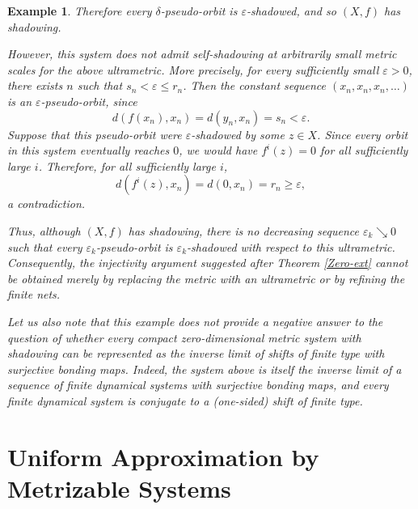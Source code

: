 \documentclass[10pt,a4paper]{amsart}
\numberwithin{equation}{section}
\newtheorem{example}[theorem]{Example}
\begin{document}
\begin{example}
Therefore every $\delta$-pseudo-orbit is $\varepsilon$-shadowed, and so
$(X,f)$ has shadowing.

However, this system does not admit self-shadowing at arbitrarily small metric
scales for the above ultrametric. More precisely, for every sufficiently small
$\varepsilon>0$, there exists $n$ such that $s_n<\varepsilon\leq r_n$. Then the
constant sequence $(x_n,x_n,x_n,\ldots)$ is an $\varepsilon$-pseudo-orbit, since
\[
    d(f(x_n),x_n)=d(y_n,x_n)=s_n<\varepsilon.
\]
Suppose that this pseudo-orbit were $\varepsilon$-shadowed by some $z\in X$.
Since every orbit in this system eventually reaches $0$, we would have
$f^i(z)=0$ for all sufficiently large $i$. Therefore, for all sufficiently large
$i$,
\[
    d(f^i(z),x_n)=d(0,x_n)=r_n\geq \varepsilon,
\]
a contradiction.

Thus, although $(X,f)$ has shadowing, there is no decreasing sequence
$\varepsilon_k\searrow 0$ such that every $\varepsilon_k$-pseudo-orbit is
$\varepsilon_k$-shadowed with respect to this ultrametric. Consequently, the
injectivity argument suggested after Theorem \ref{Zero-ext} cannot be obtained
merely by replacing the metric with an ultrametric or by refining the finite
nets.

Let us also note that this example does not provide a negative answer to the question of whether every compact zero-dimensional metric system with shadowing can be represented as the inverse limit of shifts of finite type with surjective bonding maps. Indeed, the system above is itself the inverse limit of a sequence of finite dynamical systems with surjective bonding maps, and every finite dynamical system is conjugate to a (one-sided) shift of finite type.
\end{example}






\section{Uniform Approximation by Metrizable Systems}\label{s4}
\end{document}

